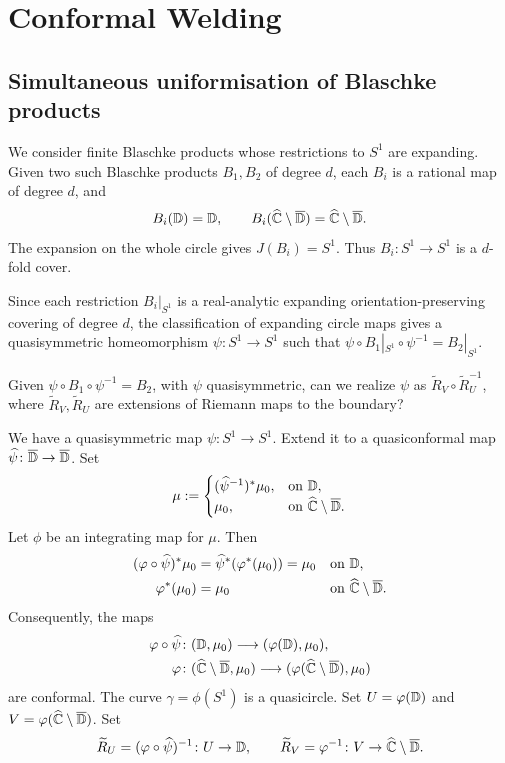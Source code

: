 \documentclass[11pt,a4paper]{article}
\begin{document}
\section*{Conformal Welding}
\subsection{Simultaneous uniformisation of Blaschke products}
We consider finite Blaschke products whose restrictions to $S^1$ are expanding.
Given two such Blaschke products $B_1,B_2$ of degree $d$, each $B_i$ is a rational map of degree $d$, and
\[
B_i(\mathbb{D})=\mathbb{D},
\qquad B_i(\widehat{\mathbb C}\setminus\overline{\mathbb{D}})=\widehat{\mathbb C}\setminus\overline{\mathbb{D}}.
\]
The expansion on the whole circle gives $J(B_i)=S^1$. Thus $B_i\colon S^1\to S^1$ is a $d$-fold cover.

Since each restriction $B_i|_{S^1}$ is a real-analytic expanding orientation-preserving covering of degree $d$, the  classification of expanding circle maps gives a quasisymmetric homeomorphism $\psi:S^1\to S^1$ such that $\psi\circ B_1|_{S^1}\circ\psi^{-1}=B_2|_{S^1}$.

Given $\psi\circ B_1\circ\psi^{-1}=B_2$, with $\psi$ quasisymmetric, can we realize $\psi$ as $\widetilde R_V\circ\widetilde R_U^{-1}$, where $\widetilde R_V,\widetilde R_U$ are extensions of Riemann maps to the boundary?

We have a quasisymmetric map $\psi\colon S^1\to S^1$. Extend it to a quasiconformal map $\widehat\psi\colon\overline{\mathbb{D}}\to\overline{\mathbb{D}}$. Set
\[
\mu:=\begin{cases}
(\widehat\psi^{-1})^*\mu_0,&\text{on }\mathbb{D},\\
\mu_0,&\text{on }\widehat{\mathbb C}\setminus\overline{\mathbb{D}}.
\end{cases}
\]
Let $\phi$ be an integrating map for $\mu$. Then
\[
\begin{aligned}
(\varphi\circ\widehat\psi)^*\mu_0
 &=\widehat\psi^*(\varphi^*(\mu_0))=\mu_0
 &&\text{on }\mathbb{D},\\
\varphi^*(\mu_0)&=\mu_0
 &&\text{on }\widehat{\mathbb C}\setminus\overline{\mathbb{D}}.
\end{aligned}
\]
Consequently, the maps
\[
\begin{aligned}
\varphi\circ\widehat\psi&\colon(\mathbb{D},\mu_0)\longrightarrow(\varphi(\mathbb{D}),\mu_0),\\
\varphi&\colon(\widehat{\mathbb C}\setminus\overline{\mathbb{D}},\mu_0)
 \longrightarrow(\varphi(\widehat{\mathbb C}\setminus\overline{\mathbb{D}}),\mu_0)
\end{aligned}
\]
are conformal. The curve $\gamma=\phi(S^1)$ is a quasicircle. Set $U=\varphi(\mathbb{D})$ and $V=\varphi(\widehat{\mathbb C}\setminus\overline{\mathbb{D}})$. Set
\[
\widetilde R_U=(\varphi\circ\widehat\psi)^{-1}\colon U\to\mathbb{D},
\qquad
\widetilde R_V=\varphi^{-1}\colon V\to\widehat{\mathbb C}\setminus\overline{\mathbb{D}}.
\]
\end{document}
